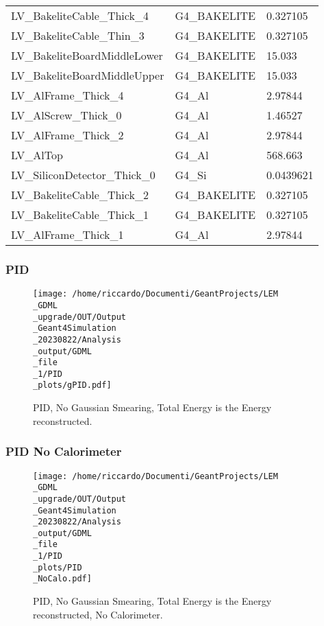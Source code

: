 \documentclass[8pt]{beamer}
\begin{document}
\begin{frame}
\begin{table}
\begin{tabular}{lll}
                        LV\_BakeliteCable\_Thick\_4 & G4\_BAKELITE & 0.327105\\
                        LV\_BakeliteCable\_Thin\_3 & G4\_BAKELITE & 0.327105\\
                        LV\_BakeliteBoardMiddleLower & G4\_BAKELITE & 15.033\\
                        LV\_BakeliteBoardMiddleUpper & G4\_BAKELITE & 15.033\\
                        LV\_AlFrame\_Thick\_4 & G4\_Al & 2.97844\\
                        LV\_AlScrew\_Thick\_0 & G4\_Al & 1.46527\\
                        LV\_AlFrame\_Thick\_2 & G4\_Al & 2.97844\\
                        LV\_AlTop & G4\_Al & 568.663\\
                        LV\_SiliconDetector\_Thick\_0 & G4\_Si & 0.0439621\\
                        LV\_BakeliteCable\_Thick\_2 & G4\_BAKELITE & 0.327105\\
                        LV\_BakeliteCable\_Thick\_1 & G4\_BAKELITE & 0.327105\\
                        LV\_AlFrame\_Thick\_1 & G4\_Al & 2.97844\\
                        
            \bottomrule
            \end{tabular}
            \end{table}
            
            \end{frame}
            
            \begin{frame}
                \frametitle{PID}
            
        \begin{figure}[h]
            \centering
            \texttt{[image: /home/riccardo/Documenti/GeantProjects/LEM\\\_GDML\\\_upgrade/OUT/Output\\\_Geant4Simulation\\\_20230822/Analysis\\\_output/GDML\\\_file\\\_1/PID\\\_plots/gPID.pdf]}
            \caption{PID, No Gaussian Smearing, Total Energy is the Energy reconstructed.}
        \end{figure}
        
            \end{frame}
            
            \begin{frame}
                \frametitle{PID No Calorimeter}
            
        \begin{figure}[h]
            \centering
            \texttt{[image: /home/riccardo/Documenti/GeantProjects/LEM\\\_GDML\\\_upgrade/OUT/Output\\\_Geant4Simulation\\\_20230822/Analysis\\\_output/GDML\\\_file\\\_1/PID\\\_plots/PID\\\_NoCalo.pdf]}
            \caption{PID, No Gaussian Smearing, Total Energy is the Energy reconstructed, No Calorimeter.}
        \end{figure}
        
            \end{frame}
            
\end{document}
